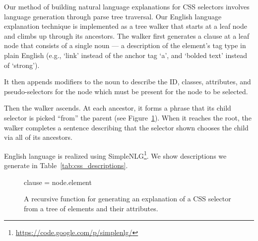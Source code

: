 Our method of building natural language explanations for CSS selectors involves language generation through parse tree traversal.
Our English language explanation technique is implemented as a tree walker that starts at a leaf node and climbs up through its ancestors.
The walker first generates a clause at a leaf node that consists of a single noun --- a description of the element's tag type in plain English (e.g., `link' instead of the anchor tag `a', and `bolded text' instead of `strong').
\begin{changes}
It then appends modifiers to the noun to describe the ID, classes, attributes, and pseudo-selectors for the node which must be present for the node to be selected.

Then the walker ascends.
At each ancestor, it forms a phrase that its child selector is picked ``from'' the parent (see Figure~\ref{alg:css_traversal}).
When it reaches the root, the walker completes a sentence describing that the selector shown chooses the child via all of its ancestors.
\end{changes}
English language is realized using SimpleNLG\footnote{\url{https://code.google.com/p/simplenlg/}}.
We show descriptions we generate in Table~\ref{tab:css_descriptions}. 

\begin{figure}
\begin{algorithmic}
\scriptsize

        clause = node.element
    \Else{}
    \EndIf{}
    \EndIf{}
    \EndIf{}
\EndFunction{}

\end{algorithmic}
\caption{A recursive function for generating an explanation of a CSS selector from a tree of elements and their attributes.}
\label{alg:css_traversal}
\end{figure}



